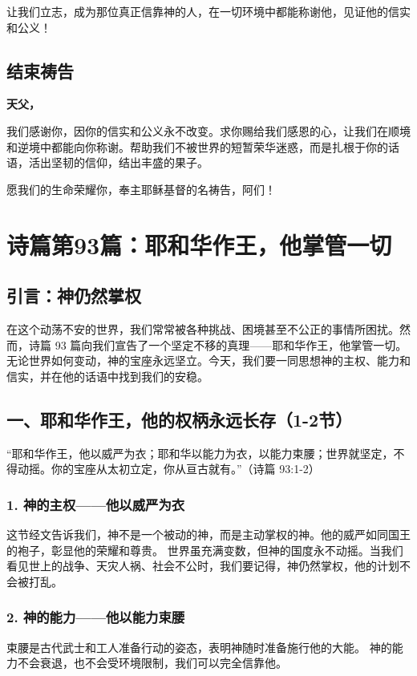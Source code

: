 \documentclass[a4paper, 12pt]{article}
\begin{document}
让我们立志，成为那位真正信靠神的人，在一切环境中都能称谢他，见证他的信实和公义！

\subsection*{结束祷告}
\textbf{天父，}

我们感谢你，因你的信实和公义永不改变。求你赐给我们感恩的心，让我们在顺境和逆境中都能向你称谢。帮助我们不被世界的短暂荣华迷惑，而是扎根于你的话语，活出坚韧的信仰，结出丰盛的果子。

愿我们的生命荣耀你，奉主耶稣基督的名祷告，阿们！
\newpage
\section{诗篇第93篇：耶和华作王，他掌管一切}

\subsection*{引言：神仍然掌权}
在这个动荡不安的世界，我们常常被各种挑战、困境甚至不公正的事情所困扰。然而，诗篇 93 篇向我们宣告了一个坚定不移的真理——耶和华作王，他掌管一切。无论世界如何变动，神的宝座永远坚立。今天，我们要一同思想神的主权、能力和信实，并在他的话语中找到我们的安稳。

\subsection*{一、耶和华作王，他的权柄永远长存（1-2节）}
“耶和华作王，他以威严为衣；耶和华以能力为衣，以能力束腰；世界就坚定，不得动摇。你的宝座从太初立定，你从亘古就有。”（诗篇 93:1-2）

\subsubsection*{1. 神的主权——他以威严为衣}
这节经文告诉我们，神不是一个被动的神，而是主动掌权的神。他的威严如同国王的袍子，彰显他的荣耀和尊贵。
世界虽充满变数，但神的国度永不动摇。当我们看见世上的战争、天灾人祸、社会不公时，我们要记得，神仍然掌权，他的计划不会被打乱。
\subsubsection*{2. 神的能力——他以能力束腰}
束腰是古代武士和工人准备行动的姿态，表明神随时准备施行他的大能。
神的能力不会衰退，也不会受环境限制，我们可以完全信靠他。
\end{document}
